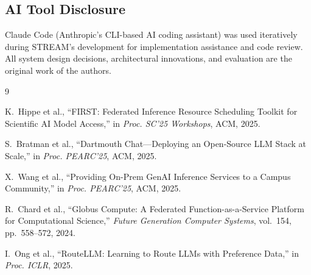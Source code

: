 \documentclass[manuscript, review]{acmart}
\begin{document}
\subsection*{AI Tool Disclosure}
Claude Code (Anthropic's CLI-based AI coding assistant) was used iteratively during STREAM's development for implementation assistance and code review. All system design decisions, architectural innovations, and evaluation are the original work of the authors.


\begin{thebibliography}{9}

K.~Hippe et al.,
``FIRST: Federated Inference Resource Scheduling Toolkit for Scientific AI Model Access,''
in \textit{Proc. SC'25 Workshops}, ACM, 2025.

S.~Bratman et al.,
``Dartmouth Chat---Deploying an Open-Source LLM Stack at Scale,''
in \textit{Proc. PEARC'25}, ACM, 2025.

X.~Wang et al.,
``Providing On-Prem GenAI Inference Services to a Campus Community,''
in \textit{Proc. PEARC'25}, ACM, 2025.

R.~Chard et al.,
``Globus Compute: A Federated Function-as-a-Service Platform for Computational Science,''
\textit{Future Generation Computer Systems}, vol.~154, pp.~558--572, 2024.

I.~Ong et al.,
``RouteLLM: Learning to Route LLMs with Preference Data,''
in \textit{Proc. ICLR}, 2025.

\end{thebibliography}
\end{document}
